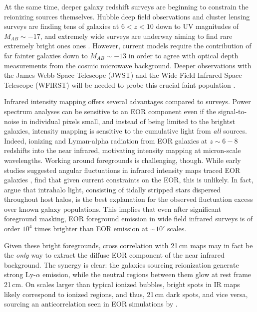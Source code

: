 \documentclass{emulateapj}
\begin{document}
At the same time, deeper galaxy redshift surveys are beginning to constrain the reionizing sources themselves. Hubble deep field observations \citep{Bouwens2011,Illingworth2013,Dunlop2013} and cluster lensing surveys are finding tens of galaxies at $6<z<10$ down to UV magnitudes of $M_{AB}\sim-17$, and extremely wide surveys are underway aiming to find rare extremely bright ones ones \citep{Schmidt2014,Trenti2011,Bradley2012}. However, current models require the contribution of far fainter galaxies down to $M_{AB}\sim-13$ \citep{Robertson2013,Alvarez2012} in order to agree with optical depth measurements \citep{planck16} from the cosmic microwave background. Deeper observations with the James Webb Space Telescope (JWST) \citep{Gardner2006} and the Wide Field Infrared Space Telescope (WFIRST) \citep{Spergel2013} will be needed to probe this crucial faint population \citep{Atek2015}.

Infrared intensity mapping offers several advantages compared to surveys. Power spectrum analyses can be sensitive to an EOR component even if the signal-to-noise in individual pixels small, and instead of being limited to the brightst galaxies, intensity mapping is sensitive to the cumulative light from \textit{all} sources. Indeed,  ionizing and Lyman-alpha radiation from EOR galaxies at $z\sim6-8$ redshifts into the near infrared, motivating intensity mapping at micron-scale wavelengths. Working around foregrounds is challenging, though. While early studies suggested angular fluctuations in infrared intensity maps traced EOR galaxies \citep[e.g.,][]{kash1,kash2,kash3}, \citet{kash4} find that given current constraints on the EOR, this is unlikely. In fact, \citet{cooray12,zemcov14} argue that intrahalo light, consisting of tidally stripped stars dispersed throughout host halos, is the best explanation for the observed fluctuation excess over known galaxy populations. This implies that even after significant foreground masking, EOR foreground emission in wide field infrared surveys is of order $10^4$ times brighter than EOR emission at $\sim10'$ scales.

Given these bright foregrounds, cross correlation with 21\,cm maps may in fact be the \textit{only} way to extract the diffuse EOR component of the near infrared background. The synergy is clear: the galaxies sourcing reionization generate strong Ly-$\alpha$ emission, while the neutral regions between them glow at rest frame 21\,cm. On scales larger than typical ionized bubbles, bright spots in IR maps likely correspond to ionized regions, and thus, 21\,cm dark spots, and vice versa, sourcing an anticorrelation seen in EOR simulations by \citet{StarsAndReionization,silva12,mao14,heneka16}. 
\end{document}
